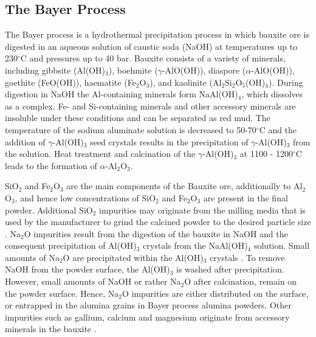 \subsection{The Bayer Process}

The Bayer process is a hydrothermal precipitation process in which bauxite ore is digested in an aqueous solution of caustic soda (NaOH) at temperatures up to 230$^{\circ}$C and pressures up to 40 bar. Bauxite consists of a variety of minerals, including gibbsite (Al(OH)$_{3}$), boehmite ($\gamma$-AlO(OH)), diaspore ($\alpha$-AlO(OH)), goethite (FeO(OH)), haematite (Fe$_{2}$O$_{3}$), and kaolinite (Al$_{2}$Si$_{2}$O$_{5}$(OH)$_{4}$). During digestion in NaOH the Al-containing minerals form NaAl(OH)$_{4}$, which dissolves as a complex. Fe- and Si-containing minerals and other accessory minerals are insoluble under these conditions and can be separated as red mud. The temperature of the sodium aluminate solution is decreased to 50-70$^{\circ}$C and the addition of $\gamma$-Al(OH)$_{3}$ seed crystals results in the precipitation of $\gamma$-Al(OH)$_{3}$ from the solution. Heat treatment and calcination of the $\gamma$-Al(OH)$_{3}$ at 1100 - 1200$^{\circ}$C leads to the formation of $\alpha$-Al$_{2}$O$_{3}$.

SiO$_{2}$ and Fe$_{2}$O$_{3}$ are the main components of the Bauxite ore, additionally to Al$_{2}$O$_{3}$, and hence low concentrations of SiO$_{2}$ and Fe$_{2}$O$_{3}$ are present in the final powder. Additional SiO$_{2}$ impurities may originate from the milling media that is used by the manufacturer to grind the calcined powder to the desired particle size \cite{Compson2013,Bennison1990}. Na$_{2}$O impurities result from the digestion of the bauxite in NaOH and the consequent precipitation of Al(OH)$_{3}$ crystals from the NaAl(OH)$_{4}$ solution. Small amounts of Na$_{2}$O are precipitated within the Al(OH)$_{3}$ crystals \cite{Compson2013}. To remove NaOH from the powder surface, the Al(OH)$_{3}$ is washed after precipitation. However, small amounts of NaOH or rather Na$_{2}$O after calcination, remain on the powder surface. Hence, Na$_{2}$O impurities are either distributed on the surface, or entrapped in the alumina grains in Bayer process alumina powders. Other impurities such as gallium, calcium and magnesium originate from accessory minerals in the bauxite \cite{Bennison1990}.

